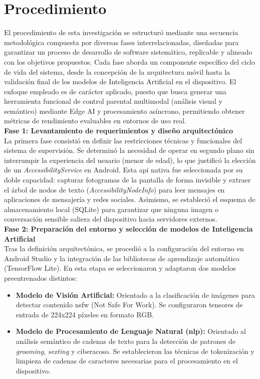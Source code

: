 \section{Procedimiento}
El procedimiento de esta investigación se estructuró mediante una secuencia metodológica compuesta por diversas fases interrelacionadas, diseñadas para garantizar un proceso de desarrollo de 
software sistemático, replicable y alineado con los objetivos propuestos. Cada fase aborda un componente específico del ciclo de vida del sistema, desde la concepción de la arquitectura móvil 
hasta la validación final de los modelos de Inteligencia Artificial en el dispositivo. El enfoque empleado es de carácter aplicado, puesto que busca generar una herramienta funcional de control 
parental multimodal (análisis visual y semántico) mediante Edge AI y procesamiento asíncrono, permitiendo obtener métricas de rendimiento evaluables en entornos de uso real. \\

\textbf{Fase 1: Levantamiento de requerimientos y diseño arquitectónico} \\
La primera fase consistió en definir las restricciones técnicas y funcionales del sistema de supervisión. Se determinó la necesidad de operar en segundo plano sin interrumpir la experiencia del 
usuario (menor de edad), lo que justificó la elección de un \textit{AccessibilityService} en Android. Esta \gls{api} nativa fue seleccionada por su doble capacidad: capturar fotogramas de la pantalla 
de forma invisible y extraer el árbol de nodos de texto (\textit{AccessibilityNodeInfo}) para leer mensajes en aplicaciones de mensajería y redes sociales. Asimismo, se estableció el esquema de almacenamiento local (SQLite) para garantizar que ninguna imagen o conversación sensible saliera del dispositivo hacia servidores externos. \\

\textbf{Fase 2: Preparación del entorno y selección de modelos de Inteligencia Artificial} \\
Tras la definición arquitectónica, se procedió a la configuración del entorno en Android Studio y la integración de las bibliotecas de aprendizaje automático (TensorFlow Lite). En esta etapa se seleccionaron y adaptaron dos modelos preentrenados distintos:
\begin{itemize}
    \item \textbf{Modelo de Visión Artificial:} Orientado a la clasificación de imágenes para detectar contenido \gls{nsfw} (Not Safe For Work). Se configuraron tensores de entrada de 224x224 píxeles en formato RGB.
    \item \textbf{Modelo de Procesamiento de Lenguaje Natural (\gls{nlp}):} Orientado al análisis semántico de cadenas de texto para la detección de patrones de \textit{grooming}, \textit{sexting} y ciberacoso. Se establecieron las técnicas de tokenización y limpieza de cadenas de caracteres necesarias para el procesamiento en el dispositivo.
\end{itemize}

